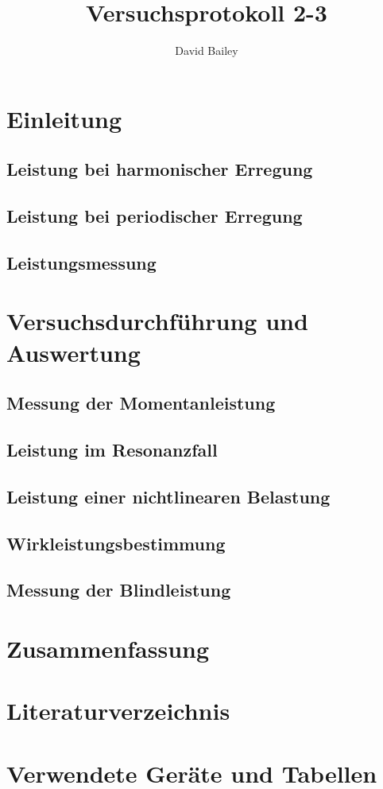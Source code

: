 \documentclass[11pt,a4paper]{article}
\author{David Bailey}
\title{Versuchsprotokoll 2-3}
\numberwithin{equation}{section}
\begin{document}


\tableofcontents

\newpage

\section{Einleitung}

\subsection{Leistung bei harmonischer Erregung}
\subsection{Leistung bei periodischer Erregung}
\subsection{Leistungsmessung}

\section{Versuchsdurchführung und Auswertung}
\subsection{Messung der Momentanleistung}
\subsection{Leistung im Resonanzfall}
\subsection{Leistung einer nichtlinearen Belastung}
\subsection{Wirkleistungsbestimmung}
\subsection{Messung der Blindleistung}

\section{Zusammenfassung}

\setcounter{section}{0}
\renewcommand{\thesection}{\Alph{section}}
\section{Literaturverzeichnis}
\section{Verwendete Geräte und Tabellen}
\end{document}
